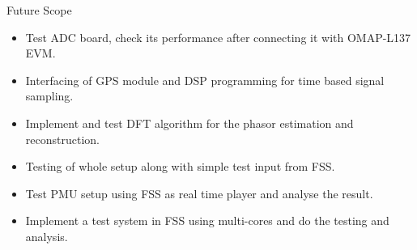 \documentclass{beamer}
\begin{document}
\begin{frame}{Future Scope}
\begin{itemize}
\item Test ADC board, check its performance after connecting it with OMAP-L137 EVM.
\item Interfacing of GPS module and DSP programming for time based signal sampling.
\item Implement and test DFT algorithm for the phasor estimation and reconstruction.
\item Testing of whole setup along with simple test input from FSS.
\item Test PMU setup using FSS as real time player and analyse the result.
\item Implement a test system in FSS using multi-cores and do the testing and analysis.
\end{itemize}
\end{frame}
\end{document}
